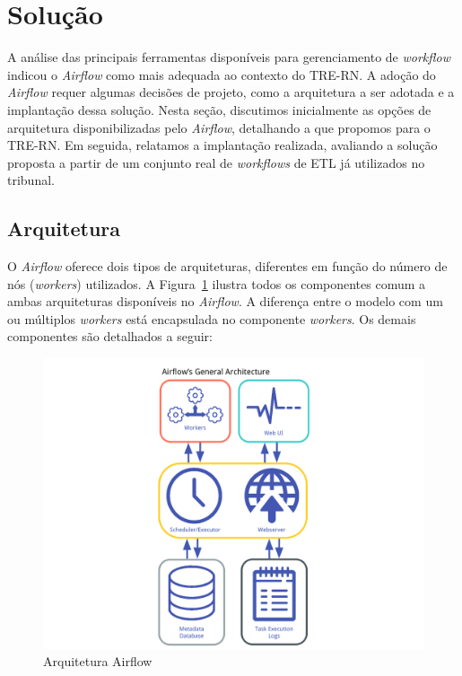 \section{Solução}

A análise das principais ferramentas disponíveis para gerenciamento de \textit{workflow} indicou o \textit{Airflow} como mais adequada ao contexto do TRE-RN. A adoção do \textit{Airflow} requer algumas decisões de projeto, como a arquitetura a ser adotada e a implantação dessa solução. Nesta seção, discutimos inicialmente as opções de arquitetura disponibilizadas pelo \textit{Airflow}, detalhando a que propomos para o TRE-RN. Em seguida, relatamos a implantação realizada, avaliando a solução proposta a partir de um conjunto real de \textit{workflows} de ETL já utilizados no tribunal.



\subsection{Arquitetura}

O \textit{Airflow} oferece dois tipos de arquiteturas, diferentes em função do número de nós (\textit{workers}) utilizados. A Figura~\ref{fig:airflow-architecture} ilustra todos os componentes comum a ambas arquiteturas disponíveis no \textit{Airflow}. A diferença entre o modelo com um ou múltiplos \textit{workers} está encapsulada no componente \textit{workers}. Os demais componentes são detalhados a seguir:

\begin{figure}[!t]
    \centering
    \includegraphics[width=\linewidth]{Imagens/airflow-architecture.png}
    \caption{Arquitetura Airflow}
    \label{fig:airflow-architecture}
\end{figure}

